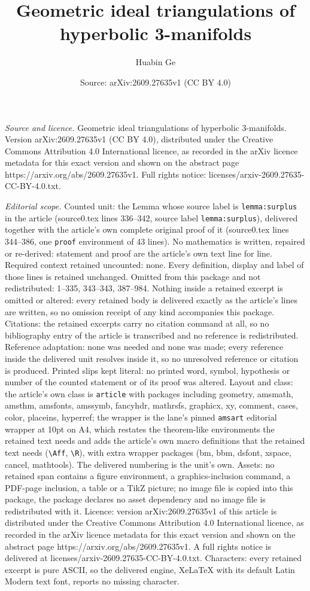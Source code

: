 \documentclass[10pt,a4paper]{amsart}
\title[Geometric ideal triangulations of hyperbolic 3-manifolds]{Geometric ideal triangulations of hyperbolic 3-manifolds}
\author{Huabin Ge}
\date{Source: arXiv:2609.27635v1 (CC BY 4.0)}
\begin{document}
\maketitle

\noindent\emph{Source and licence.} Geometric ideal triangulations of hyperbolic 3-manifolds. Version arXiv:2609.27635v1 (CC BY 4.0), distributed under the Creative Commons Attribution 4.0 International licence, as recorded in the arXiv licence metadata for this exact version and shown on the abstract page https://arxiv.org/abs/2609.27635v1. Full rights notice: licenses/arxiv-2609.27635-CC-BY-4.0.txt.\par\smallskip

\noindent\textit{Editorial scope.} Counted unit: the Lemma whose source label is \texttt{lemma:surplus} in the article (source0.tex lines 336--342, source label \texttt{lemma:surplus}), delivered together with the article's own complete original proof of it (source0.tex lines 344--386, one \texttt{proof} environment of 43 lines). No mathematics is written, repaired or re-derived: statement and proof are the article's own text line for line. Required context retained uncounted: none. Every definition, display and label of those lines is retained unchanged. Omitted from this package and not redistributed: 1--335, 343--343, 387--984. Nothing inside a retained excerpt is omitted or altered: every retained body is delivered exactly as the article's lines are written, so no omission receipt of any kind accompanies this package. Citations: the retained excerpts carry no citation command at all, so no bibliography entry of the article is transcribed and no reference is redistributed. Reference adaptation: none was needed and none was made; every reference inside the delivered unit resolves inside it, so no unresolved reference or citation is produced. Printed slips kept literal: no printed word, symbol, hypothesis or number of the counted statement or of its proof was altered. Layout and class: the article's own class is \texttt{article} with packages including geometry, amsmath, amsthm, amsfonts, amssymb, fancyhdr, mathrsfs, graphicx, xy, comment, cases, color, placeins, hyperref; the wrapper is the lane's pinned \texttt{amsart} editorial wrapper at 10pt on A4, which restates the theorem-like environments the retained text needs and adds the article's own macro definitions that the retained text needs (\texttt{\textbackslash Aff}, \texttt{\textbackslash R}), with extra wrapper packages (bm, bbm, dsfont, xspace, cancel, mathtools). The delivered numbering is the unit's own. Assets: no retained span contains a figure environment, a graphics-inclusion command, a PDF-page inclusion, a table or a TikZ picture; no image file is copied into this package, the package declares no asset dependency and no image file is redistributed with it. Licence: version arXiv:2609.27635v1 of this article is distributed under the Creative Commons Attribution 4.0 International licence, as recorded in the arXiv licence metadata for this exact version and shown on the abstract page https://arxiv.org/abs/2609.27635v1. A full rights notice is delivered at licenses/arxiv-2609.27635-CC-BY-4.0.txt. Characters: every retained excerpt is pure ASCII, so the delivered engine, XeLaTeX with its default Latin Modern text font, reports no missing character.
\end{document}
